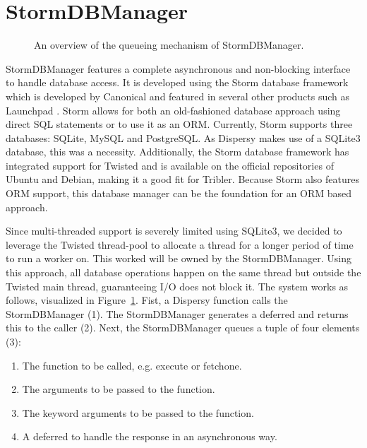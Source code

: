 \section{StormDBManager}

\begin{figure}[h]
	\caption{An overview of the queueing mechanism of StormDBManager.}
	\label{fig:storm_db_worker}
\end{figure}

StormDBManager features a complete asynchronous and non-blocking interface to handle database access.
It is developed using the Storm database framework which is developed by Canonical and featured in several other products such as Launchpad \cite{canonical2011storm}.
Storm allows for both an old-fashioned database approach using direct SQL statements or to use it as an ORM.
Currently, Storm supports three databases: SQLite, MySQL and PostgreSQL.
As Dispersy makes use of a SQLite3 database, this was a necessity.
Additionally, the Storm database framework has integrated support for Twisted and is available on the official repositories of Ubuntu and Debian, making it a good fit for Tribler.
Because Storm also features ORM support, this database manager can be the foundation for an ORM based approach.

Since multi-threaded support is severely limited using SQLite3, we decided to leverage the Twisted thread-pool to allocate a thread for a longer period of time to run a worker on.
This worked will be owned by the StormDBManager.
Using this approach, all database operations happen on the same thread but outside the Twisted main thread, guaranteeing I/O does not block it.
The system works as follows, visualized in Figure~\ref{fig:storm_db_worker}.
Fist, a Dispersy function calls the StormDBManager (1).
The StormDBManager generates a deferred and returns this to the caller (2).
Next, the StormDBManager queues a tuple of four elements (3):

\begin{enumerate}
	\item The function to be called, e.g. execute or fetchone.
	\item The arguments to be passed to the function.
	\item The keyword arguments to be passed to the function.
	\item A deferred to handle the response in an asynchronous way.
\end{enumerate}

